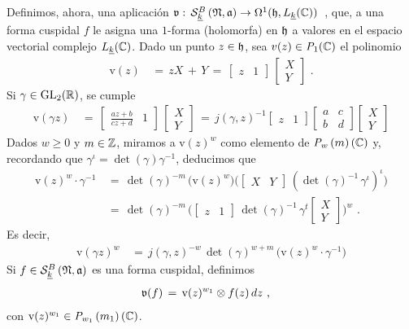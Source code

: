 Definimos, ahora, una aplicaci\'{o}n
\begin{math}
	\frak{v}:\,\spitzH[B]{k}{\frak{N},\frak{a}}\rightarrow
		\Omega^{1}(\hP,L_{\peso{k}}(\bb{C}))
\end{math}~,
que, a una forma cuspidal $f$ le asigna una $1$-forma (holomorfa) en $\hP$ a
valores en el espacio vectorial complejo $L_{\peso{k}}(\bb{C})$. Dado un punto
$z\in\hP$, sea $v(z)\in\wpoli{1}(\bb{C})$ el polinomio
\begin{align*}
	\mathrm{v}(z) & \,=\, zX\,+\,Y \,=\,
		\begin{bmatrix} z & 1 \end{bmatrix}\,
		\begin{bmatrix} X \\ Y \end{bmatrix}
	\text{ .}
\end{align*}
%
Si $\gamma\in\GL_{2}(\bb{R})$, se cumple
\begin{align*}
	\mathrm{v}(\gamma z) & \,=\,
		\begin{bmatrix} \frac{az+b}{cz+d} & 1 \end{bmatrix}\,
		\begin{bmatrix} X \\ Y \end{bmatrix}
	\,=\, j(\gamma,z)^{-1} \begin{bmatrix} z & 1 \end{bmatrix}
		\begin{bmatrix} a & c \\ b & d \end{bmatrix}
		\begin{bmatrix} X \\ Y \end{bmatrix}
\end{align*}
%
Dados $w\geq 0$ y $m\in\bb{Z}$, miramos a $\mathrm{v}(z)^{w}$ como elemento de
$\wmpoli{w}{m}(\bb{C})$ y, recordando que
$\gamma^\iota=\det(\gamma)\gamma^{-1}$, deducimos que
\begin{align*}
	\mathrm{v}(z)^{w}\cdot\gamma^{-1} & \,=\,\det(\gamma)^{-m}\,
		\big(\mathrm{v}(z)^{w}\big) \Big(
		\begin{bmatrix} X & Y \end{bmatrix}\,
			(\det(\gamma)^{-1}\,\gamma^\iota)^\iota\Big) \\
	& \,=\,\det(\gamma)^{-m}\,\Big(
		\begin{bmatrix} z & 1 \end{bmatrix}\,\det(\gamma)^{-1}\,
			\gamma^t
		\begin{bmatrix} X \\ Y \end{bmatrix}\Big)^{w}
	\text{ .}
\end{align*}
%
Es decir,
\begin{align*}
	\mathrm{v}(\gamma z)^{w} & \,=\,j(\gamma,z)^{-w}\,\det(\gamma)^{w+m}\,
		\big(\mathrm{v}(z)^{w}\cdot\gamma^{-1}\big)
\end{align*}
%
Si $f\in\spitzH[B]{k}{\frak{N},\frak{a}}$ es una forma cuspidal, definimos
\begin{align*}
	\frak{v}(f) & \,=\, \mathrm{v}(z)^{w_{1}}\otimes f(z)\,dz
	\text{ ,}
\end{align*}
%
con $\mathrm{v}(z)^{w_{1}}\in\wmpoli{w_{1}}{m_{1}}(\bb{C})$.

